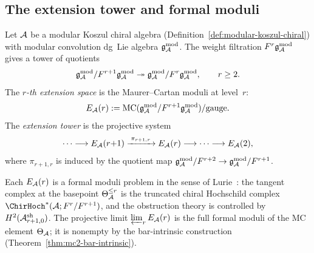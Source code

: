 
\subsection{The extension tower and formal moduli}
\label{subsec:extension-tower}

\begin{definition}
\label{def:extension-tower-thqg}
Let $\mathcal{A}$ be a modular Koszul chiral algebra
(Definition~\ref{def:modular-koszul-chiral}) with
modular convolution dg~Lie algebra $\mathfrak{g}_{\mathcal{A}}^{\mathrm{mod}}$.
The weight filtration $F^r \mathfrak{g}_{\mathcal{A}}^{\mathrm{mod}}$ gives a tower
of quotients
\[
\mathfrak{g}_{\mathcal{A}}^{\mathrm{mod}} / F^{r+1} \mathfrak{g}_{\mathcal{A}}^{\mathrm{mod}}
\twoheadrightarrow
\mathfrak{g}_{\mathcal{A}}^{\mathrm{mod}} / F^r \mathfrak{g}_{\mathcal{A}}^{\mathrm{mod}},
\qquad r \geq 2.
\]
The \emph{$r$-th extension space} is the Maurer--Cartan
moduli at level~$r$:
\begin{equation}\label{eq:extension-space-def}
E_{\mathcal{A}}(r) := \mathrm{MC}(\mathfrak{g}_{\mathcal{A}}^{\mathrm{mod}} / F^{r+1} \mathfrak{g}_{\mathcal{A}}^{\mathrm{mod}})
/ \mathrm{gauge}.
\end{equation}
The \emph{extension tower} is the projective system
\begin{equation}\label{eq:extension-tower-thqg}
\cdots \longrightarrow
E_{\mathcal{A}}(r{+}1) \xrightarrow{\;\pi_{r+1,r}\;}
E_{\mathcal{A}}(r) \longrightarrow \cdots
\longrightarrow E_{\mathcal{A}}(2),
\end{equation}
where $\pi_{r+1,r}$ is induced by the quotient map
$\mathfrak{g}_{\mathcal{A}}^{\mathrm{mod}} / F^{r+2} \to \mathfrak{g}_{\mathcal{A}}^{\mathrm{mod}} / F^{r+1}$.
\end{definition}

\begin{remark}
\label{rem:extension-formal-moduli}
Each $E_{\mathcal{A}}(r)$ is a formal moduli problem in the sense
of Lurie~\cite{LurieDAGX}:
the tangent complex at the basepoint
$\Theta_{\mathcal{A}}^{\leq r}$ is the truncated chiral Hochschild
complex $\ChirHoch^*(\cA; F^r/F^{r+1})$, and the
obstruction theory is controlled by
$H^2(\mathcal{A}^{\mathrm{sh}}_{r+1,0})$. The projective limit
$\varprojlim_r E_{\mathcal{A}}(r)$ is the full formal moduli
of the MC element $\Theta_{\mathcal{A}}$; it is nonempty by the
bar-intrinsic construction
(Theorem~\ref{thm:mc2-bar-intrinsic}).
\end{remark}

